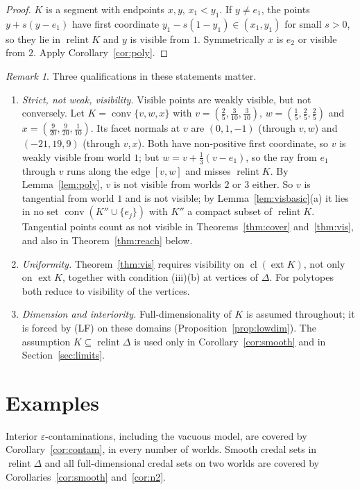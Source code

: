 \documentclass[11pt]{article}
\DeclareMathOperator{\conv}{conv}
\DeclareMathOperator{\relint}{relint}
\DeclareMathOperator{\ext}{ext}
\DeclareMathOperator{\cl}{cl}
\theoremstyle{plain}
\theoremstyle{definition}
\theoremstyle{remark}
\newtheorem{remark}[theorem]{Remark}
\begin{document}
\begin{proof}
$K$ is a segment with endpoints $x,y$, $x_1<y_1$. If $y\neq e_1$, the points
$y+s(y-e_1)$ have first coordinate $y_1-s(1-y_1)\in(x_1,y_1)$ for small $s>0$, so they lie in
$\relint K$ and $y$ is visible from $1$. Symmetrically $x$ is $e_2$ or visible from $2$.
Apply Corollary~\ref{cor:poly}.
\end{proof}

\begin{remark}\label{rem:qual}
Three qualifications in these statements matter.
\begin{enumerate}[label=(\arabic*)]
  \item \emph{Strict, not weak, visibility.} Visible points are weakly visible, but not
  conversely. Let $K=\conv\{v,w,x\}$ with $v=(\frac25,\frac3{10},\frac3{10})$,
  $w=(\frac15,\frac25,\frac25)$ and $x=(\frac9{20},\frac9{20},\frac1{10})$. Its facet
  normals at $v$ are $(0,1,-1)$ (through $v,w$) and $(-21,19,9)$ (through $v,x$). Both have
  non-positive first coordinate, so $v$ is weakly visible from world $1$; but
  $w=v+\frac13(v-e_1)$, so the ray from $e_1$ through $v$ runs along the edge $[v,w]$ and
  misses $\relint K$. By Lemma~\ref{lem:poly}, $v$ is not visible from worlds $2$ or $3$
  either. So $v$ is tangential from world $1$ and is not visible; by
  Lemma~\ref{lem:visbasic}(a) it lies in no set $\conv(K''\cup\{e_j\})$ with $K''$ a
  compact subset of $\relint K$. Tangential points count as not visible in
  Theorems~\ref{thm:cover} and~\ref{thm:vis}, and also in Theorem~\ref{thm:reach} below.
  \item \emph{Uniformity.} Theorem~\ref{thm:vis} requires visibility on $\cl(\ext K)$, not
  only on $\ext K$, together with condition (iii)(b) at vertices of $\Delta$. For
  polytopes both reduce to visibility of the vertices.
  \item \emph{Dimension and interiority.} Full-dimensionality of $K$ is assumed throughout;
  it is forced by (LF) on these domains (Proposition~\ref{prop:lowdim}). The assumption
  $K\subseteq\relint\Delta$ is used only in Corollary~\ref{cor:smooth} and in
  Section~\ref{sec:limits}.
\end{enumerate}
\end{remark}

\section{Examples}\label{sec:examples}

Interior $\varepsilon$-contaminations, including the vacuous model, are covered by
Corollary~\ref{cor:contam}, in every number of worlds. Smooth credal sets in
$\relint\Delta$ and all full-dimensional credal sets on two worlds are covered by
Corollaries~\ref{cor:smooth} and~\ref{cor:n2}.
\end{document}
